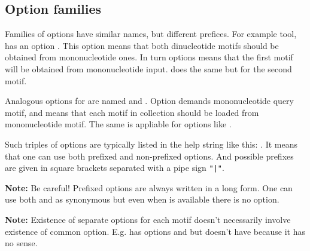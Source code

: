 \subsection{Option families}
{\small
Families of options have similar names, but different prefices. For example  tool, has an option . This option means that both dinucleotide motifs should be obtained from mononucleotide ones. In turn  options means that the first motif will be obtained from mononucleotide input.  does the same but for the second motif.

Analogous options for  are named  and . Option  demands mononucleotide query motif, and  means that each motif in collection should be loaded from mononucleotide motif. The same is appliable for options like .

Such triples of options are typically listed in the help string like this: . It means that one can use both prefixed and non-prefixed options. And possible prefixes are given in square brackets separated with a pipe sign \texttt{"|"}.

\textbf{Note:} Be careful! Prefixed options are always written in a long form. One can use both  and  as synonymous but even when  is available there is no  option.

\textbf{Note:} Existence of separate options for each motif doesn't necessarily involve existence of common option. E.g.  has options  and  but doesn't have  because it has no sense.
}
